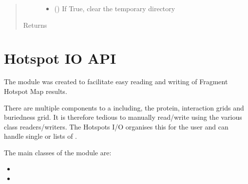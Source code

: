 \documentclass[letterpaper,10pt,english]{sphinxmanual}
\begin{document}
\begin{fulllineitems}
\begin{fulllineitems}
\begin{quote}
\begin{description}
\begin{itemize}
\item {} 
 () \textendash{} If True, clear the temporary directory

\end{itemize}

\item[{Returns}] \leavevmode


\end{description}\end{quote}

\end{fulllineitems}


\end{fulllineitems}



\chapter{Hotspot IO API}
\label{\detokenize{hs_io_api:module-hotspots.hs_io}}\label{\detokenize{hs_io_api:hotspot-io-api}}\label{\detokenize{hs_io_api::doc}}
The {\hyperref[\detokenize{hs_io_api:module-hotspots.hs_io}]{}} module was created to facilitate easy reading and
writing of Fragment Hotspot Map results.

There are multiple components to a  including, the
protein, interaction grids and buriedness grid. It is therefore tedious to manually
read/write using the various class readers/writers. The Hotspots I/O organises this
for the user and can handle single  or lists of
.

The main classes of the  module are:
\begin{itemize}
\item {} 

\item {} 

\end{itemize}
\end{document}
